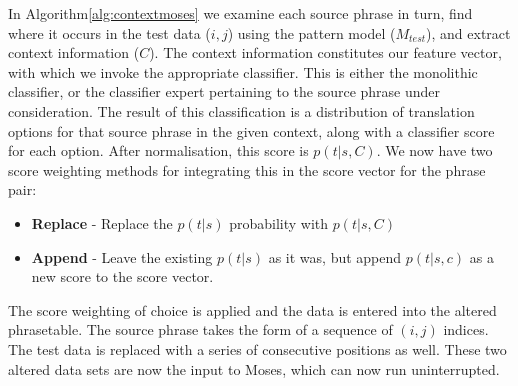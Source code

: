 \documentclass[11pt]{article}
\begin{document}
In Algorithm\ref{alg:contextmoses} we examine each source phrase in turn, find
where it occurs in the test data ($i,j$) using the pattern model ($M_{test}$),
and extract context information ($C$). The context information constitutes our
feature vector, with which we invoke the appropriate classifier. This is either
the monolithic classifier, or the classifier expert pertaining to the source
phrase under consideration. The result of this classification is a distribution
of translation options for that source phrase in the given context, along with
a classifier score for each option. After normalisation, this score is
$p(t|s,C)$. We now have two score weighting methods for integrating this in the
score vector for the phrase pair:

\begin{itemize}
  \item \textbf{Replace} - Replace the $p(t|s)$ probability with $p(t|s,C)$
  \item \textbf{Append} - Leave the existing $p(t|s)$ as it was, but append
    $p(t|s,c)$ as a new score to the score vector.
\end{itemize}

The score weighting of choice is applied and the data is entered into the altered
phrasetable. The source phrase takes the form of a sequence of $(i,j)$ indices.
The test data is replaced with a series of consecutive positions as well. These
two altered data sets are now the input to Moses, which can now run
uninterrupted. 









\end{document}
